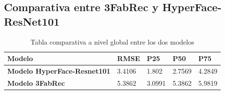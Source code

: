     \subsection{Comparativa entre 3FabRec y HyperFace-ResNet101}
        \begin{table}[!ht]
            \centering
            \caption{Tabla comparativa a nivel global entre los dos modelos}
            \begin{tabular}{|l|l|l|l|l|}
            \hline
                \cellcolor{gray!25}\textbf{Modelo} & \cellcolor{gray!25}\textbf{RMSE} & \cellcolor{gray!25}\textbf{P25} & \cellcolor{gray!25}\textbf{P50} & \cellcolor{gray!25}\textbf{P75} \\ \hline
                \textbf{Modelo HyperFace-Resnet101} & \cellcolor{green!25}3.4106 & \cellcolor{green!25}1.802 & \cellcolor{green!25}2.7569 & \cellcolor{green!25}4.2849 \\ \hline
                \textbf{Modelo 3FabRec} & 5.3862 & 3.0991 & 5.3862 & 5.9819 \\ \hline
            \end{tabular}
            \label{table:comparativa-global}
        \end{table}


